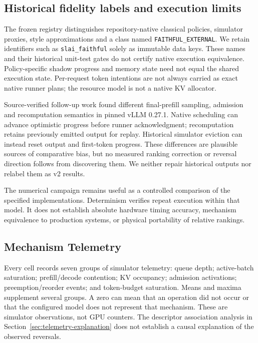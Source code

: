 \subsection{Historical fidelity labels and execution limits}\label{sec:fidelity}\label{sec:vv-structure}
The frozen registry distinguishes repository-native classical policies,
simulator proxies, style approximations and a class named
\texttt{FAITHFUL\_EXTERNAL}. We retain identifiers such as
\texttt{slai\_faithful} solely as immutable data keys. These names and their
historical unit-test gates do not certify native execution equivalence.
Policy-specific shadow progress and memory state need not equal the shared
execution state. Per-request token intentions are not always carried as
exact native runner plans; the resource model is not a native KV allocator.

Source-verified follow-up work found different final-prefill sampling,
admission and recomputation semantics in pinned vLLM 0.27.1. Native
scheduling can advance optimistic progress before runner acknowledgment;
recomputation retains previously emitted output for replay. Historical
simulator eviction can instead reset output and first-token progress.
These differences are plausible sources of comparative bias, but no
measured ranking correction or reversal direction follows from discovering
them. We neither repair historical outputs nor relabel them as v2 results.

The numerical campaign remains useful as a controlled comparison of the
specified implementations. Determinism verifies repeat execution within
that model. It does not establish absolute hardware timing accuracy,
mechanism equivalence to production systems, or physical portability of
relative rankings.
\subsection{Mechanism Telemetry}
\label{sec:telemetry}

Every cell records seven groups of simulator telemetry: queue depth;
active-batch saturation; prefill/decode contention; KV occupancy;
admission activations; preemption/reorder events; and token-budget
saturation. Means and maxima supplement several groups. A zero can mean
that an operation did not occur or that the configured model does not
represent that mechanism. These are simulator observations, not GPU
counters. The descriptor association analysis in
Section~\ref{sec:telemetry-explanation} does not establish a causal
explanation of the observed reversals.

